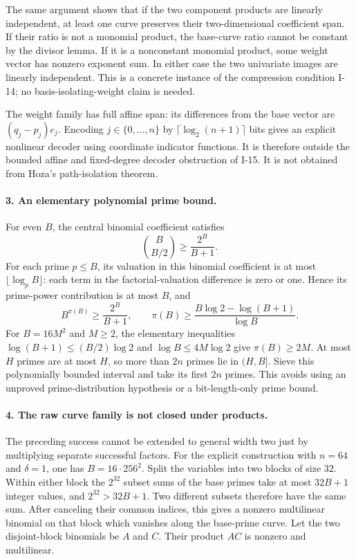 The same argument shows that if the two component products
are linearly independent, at least one curve preserves
their two-dimensional coefficient span.  If their ratio is
not a monomial product, the base-curve ratio cannot be
constant by the divisor lemma.  If it is a nonconstant
monomial product, some weight vector has nonzero exponent
sum.  In either case the two univariate images are linearly
independent.  This is a concrete instance of the compression
condition I-14; no basis-isolating-weight claim is needed.

The weight family has full affine span: its differences
from the base vector are $(q_j-p_j)e_j$.  Encoding
$j\in\{0,\ldots,n\}$ by $\lceil\log_2(n+1)\rceil$ bits
gives an explicit nonlinear decoder using coordinate
indicator functions.  It is therefore outside the bounded
affine and fixed-degree decoder obstruction of I-15.
It is not obtained from Hoza's path-isolation theorem.

\paragraph{3. An elementary polynomial prime bound.}
For even $B$, the central binomial coefficient satisfies
\[
 \binom{B}{B/2}\ge\frac{2^B}{B+1}.
\]
For each prime $p\le B$, its valuation in this binomial
coefficient is at most $\lfloor\log_p B\rfloor$: each
term in the factorial-valuation difference is zero or one.
Hence its prime-power contribution is at most $B$, and
\[
 B^{\pi(B)}\ge\frac{2^B}{B+1},\qquad
 \pi(B)\ge\frac{B\log2-\log(B+1)}{\log B}.
\]
For $B=16M^2$ and $M\ge2$, the elementary inequalities
$\log(B+1)\le(B/2)\log2$ and $\log B\le4M\log2$
give $\pi(B)\ge2M$.  At most $H$ primes are at most $H$,
so more than $2n$ primes lie in $(H,B]$.
Sieve this polynomially bounded interval and take its first
$2n$ primes.  This avoids using an unproved prime-distribution
hypothesis or a bit-length-only prime bound.

\paragraph{4. The raw curve family is not closed under products.}
The preceding success cannot be extended to general width
two just by multiplying separate successful factors.
For the explicit construction with $n=64$ and $\delta=1$,
one has $B=16\cdot256^2$.  Split the variables into two
blocks of size $32$.  Within either block the $2^{32}$
subset sums of the base primes take at most $32B+1$
integer values, and $2^{32}>32B+1$.  Two different subsets
therefore have the same sum.  After canceling their common
indices, this gives a nonzero multilinear binomial on that
block which vanishes along the base-prime curve.
Let the two disjoint-block binomials be $A$ and $C$.
Their product $AC$ is nonzero and multilinear.

